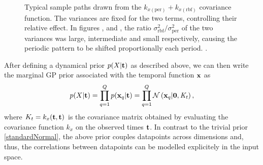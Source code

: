 \documentclass [10pt , a4paper]{article}
\begin{document}
\begin{figure}[ht]
\begin{center}
\end{center}
\caption{
  \small{
    Typical sample paths drawn from the $k_{x(\text{per})} + k_{x(\text{rbf})}$ covariance function.
    The variances are fixed for the two terms,
    controlling their relative effect. In figures ,  and ,
    the ratio $\sigma_{\text{rbf}}^2 / \sigma_{\text{per}}^2$ of the two variances was large, intermediate and small respectively,
    causing the periodic pattern to be shifted proportionally each period.
  }.
}
\label{fig:rbfPeriodic}
\end{figure}

\noindent After defining a dynamical prior $p(X | \mathbf{t})$ as described above, we can then write the marginal GP prior associated with
the temporal function $\mathbf{x}$ as
\begin{equation}
p(X | \mathbf{t})  = \prod_{q=1}^Q p(\mathbf{x}_q|\mathbf{t}) = \prod_{q=1}^Q \mathcal{N} \left( \mathbf{x}_q | \mathbf{0},
  \mathit{K_t} \right),
\label{priorXgivenT}
\end{equation}
\noindent where $K_t = k_x(\mathbf{t},\mathbf{t})$ is the covariance matrix obtained by
evaluating the covariance function $\mathit{k}_x$ on the observed times
$\mathbf{t}$. In contrast to the trivial prior \eqref{standardNormal}, the above prior couples datapoints across dimensions and, thus,
the correlations between datapoints can be modelled explicitely in the input space.
\end{document}
